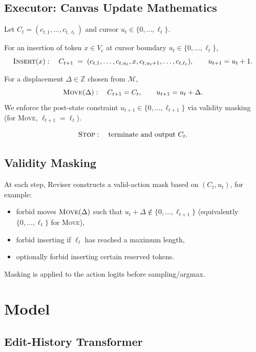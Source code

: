 \documentclass[11pt]{article}
\DeclareRobustCommand{\Stop}{\ifmmode\text{\textsc{Stop}}\else\textsc{Stop}\fi}
\DeclareRobustCommand{\Insert}{\ifmmode\text{\textsc{Insert}}\else\textsc{Insert}\fi}
\DeclareRobustCommand{\Move}{\ifmmode\text{\textsc{Move}}\else\textsc{Move}\fi}
\newcommand{\Mset}{\mathcal{M}}
\begin{document}
\subsection{Executor: Canvas Update Mathematics}
\label{sec:updates}

Let $C_t = (c_{t,1},\dots,c_{t,\ell_t})$ and cursor $u_t \in \{0,\dots,\ell_t\}$.

For an insertion of token $x \in V_c$ at cursor boundary $u_t \in \{0,\dots,\ell_t\}$,
\[
\Insert(x):\quad
C_{t+1} \;=\;
(c_{t,1}, \dots, c_{t,u_t}, x, c_{t,u_t+1}, \dots, c_{t,\ell_t}),
\qquad
u_{t+1} = u_t + 1.
\]

For a displacement $\Delta \in \mathbb{Z}$ chosen from $\Mset$,
\[
\Move(\Delta):\quad
C_{t+1} = C_t, \qquad
u_{t+1} = u_t + \Delta.
\]
We enforce the post-state constraint $u_{t+1}\in\{0,\dots,\ell_{t+1}\}$ via validity masking (for \Move{}, $\ell_{t+1}=\ell_t$).

\[
\Stop:\quad \text{terminate and output } C_t.
\]

\subsection{Validity Masking}
\label{sec:masking}

At each step, Reviser constructs a valid-action mask based on $(C_t,u_t)$, for example:
\begin{itemize}[leftmargin=*,itemsep=0.2em]
\item forbid moves $\Move(\Delta)$ such that $u_t+\Delta \notin \{0,\dots,\ell_{t+1}\}$ (equivalently $\{0,\dots,\ell_t\}$ for \Move{}),
\item forbid inserting if $\ell_t$ has reached a maximum length,
\item optionally forbid inserting certain reserved tokens.
\end{itemize}
Masking is applied to the action logits before sampling/argmax.

\section{Model}
\label{sec:model}

\subsection{Edit-History Transformer}
\label{sec:history_transformer}
\end{document}
